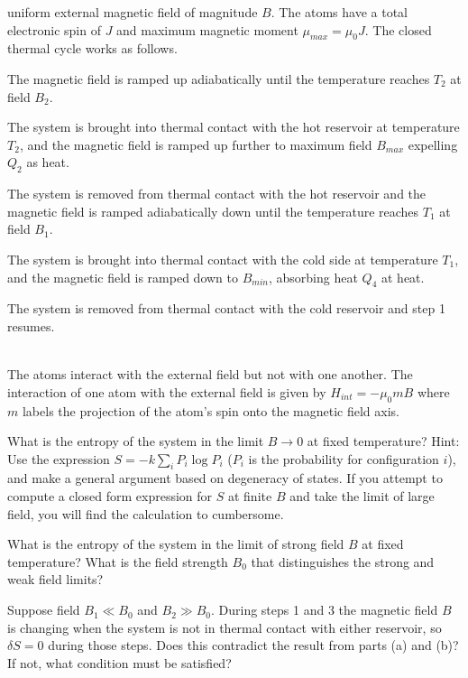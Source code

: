 \documentclass[10pt,letterpaper]{article}
\begin{document}
	uniform external magnetic field of magnitude $B$. The atoms have a total electronic spin of $J$ and
	maximum magnetic moment $\mu_{max} = \mu_0J$. The closed thermal cycle works as follows.
	\benum
	\item
	The magnetic field is ramped up adiabatically until the temperature reaches $T_2$ at field $B_2$.
	\item
	The system is brought into thermal contact with the hot reservoir at temperature $T_2$, and the 
	magnetic field is ramped up further to maximum field $B_{max}$ expelling $Q_2$ as heat.
	\item
	The system is removed from thermal contact with the hot reservoir and the magnetic field is
	ramped adiabatically down until the temperature reaches $T_1$ at field $B_1$.
	\item
	The system is brought into thermal contact with the cold side at temperature $T_1$, and 
	the magnetic field is ramped down to $B_{min}$, absorbing heat $Q_4$ at heat.
	\item
	The system is removed from thermal contact with the cold reservoir and step 1 resumes.
	\\ \\
	\eenum

	The atoms interact with the external field but not with one another. The interaction of one atom with
	the external field is given by $H_{int} = -\mu_0 m B$ where $m$ labels the projection of the atom's spin
	onto the magnetic field axis.
	
	
	\benum
	\item
	What is the entropy of the system in the limit $B\to 0$ at fixed temperature? Hint: Use the expression
	$S = -k\sum_i P_i\log P_i$ ($P_i$ is the probability for configuration $i$), and make a general argument
	based on degeneracy of states. If you attempt to compute a closed form expression for $S$ at finite
	$B$ and take the limit of large field, you will find the calculation to cumbersome. 
	
	\item
	What is the entropy of the system in the limit of strong field $B$ at fixed temperature? What is the field
	strength $B_0$ that distinguishes the strong and weak field limits?
	
	\item Suppose field $B_1 \ll B_0$ and $B_2\gg B_0$. During steps 1 and 3 the magnetic field $B$ is
	changing when the system is not in thermal contact with either reservoir, so $\delta S = 0$
	during those steps. Does this contradict the result from parts (a) and (b)? If not, what condition must
	be satisfied?
	
\end{document}
